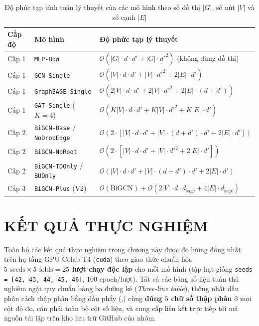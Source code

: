 \documentclass[11pt,a4paper]{extreport}
\begin{document}
\begin{table}[htbp]
    \centering
    \caption{Độ phức tạp tính toán lý thuyết của các mô hình theo số đồ thị $|G|$, số nút $|V|$ và số cạnh $|E|$}
    \label{tab:complexity-theory}
    \small
    \begin{tabular}{@{}lll@{}}
        \toprule
        \textbf{Cấp độ} & \textbf{Mô hình} & \textbf{Độ phức tạp lý thuyết} \\
        \midrule
        Cấp 1 & \texttt{MLP-BoW} & $\mathcal{O}(|G|\cdot d\cdot d' + |G|\cdot d'^2)$ (không dùng đồ thị) \\
        Cấp 1 & \texttt{GCN-Single} & $\mathcal{O}(|V|\cdot d\cdot d' + |V|\cdot d'^2 + 2|E|\cdot d')$ \\
        Cấp 1 & \texttt{GraphSAGE-Single} & $\mathcal{O}(2|V|\cdot d\cdot d' + 2|V|\cdot d'^2 + 2|E|\cdot(d+d'))$ \\
        Cấp 1 & \texttt{GAT-Single} ($K=4$) & $\mathcal{O}(K|V|\cdot d\cdot d' + K|V|\cdot d'^2 + K|E|\cdot d')$ \\
        Cấp 2 & \texttt{BiGCN-Base} / \texttt{NoDropEdge} & $\mathcal{O}(2\cdot[|V|\cdot d\cdot d' + |V|\cdot(d+d')\cdot d' + 2|E|\cdot d'])$ \\
        Cấp 2 & \texttt{BiGCN-NoRoot} & $\mathcal{O}(2\cdot[|V|\cdot d\cdot d' + |V|\cdot d'^2 + 2|E|\cdot d'])$ \\
        Cấp 2 & \texttt{BiGCN-TDOnly} / \texttt{BUOnly} & $\mathcal{O}(|V|\cdot d\cdot d' + |V|\cdot(d+d')\cdot d' + 2|E|\cdot d')$ \\
        Cấp 3 & \texttt{BiGCN-Plus} (V2) & $\mathcal{O}(\text{BiGCN}) + \mathcal{O}(2|V|\cdot d\cdot d_{\text{sage}} + 4|E|\cdot d_{\text{sage}})$ \\
        \bottomrule
    \end{tabular}
\end{table}

\chapter{KẾT QUẢ THỰC NGHIỆM}

Toàn bộ các kết quả thực nghiệm trong chương này được đo lường đồng nhất trên hạ tầng GPU Colab T4 (\texttt{cuda}) theo giao thức chuẩn hóa \textbf{$5\text{ seeds} \times 5\text{ folds} = 25$ lượt chạy độc lập} cho mỗi mô hình (tập hạt giống \texttt{seeds = [42, 43, 44, 45, 46]}, $100$ epoch/lượt). Tất cả các bảng số liệu tuân thủ nghiêm ngặt quy chuẩn bảng ba đường kẻ (\textit{Three-line table}), thống nhất dấu phân cách thập phân bằng dấu phẩy (,) cùng \textbf{đúng $5$ chữ số thập phân} ở mọi cột độ đo, căn phải toàn bộ cột số liệu, và cung cấp liên kết trực tiếp tới mã nguồn tái lập trên kho lưu trữ GitHub của nhóm.
\end{document}

